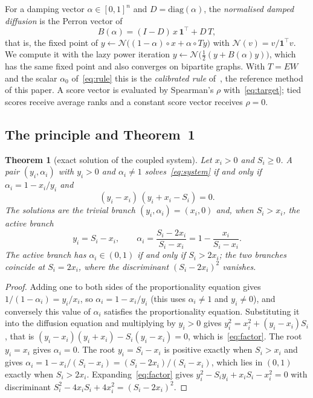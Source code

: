\documentclass[11pt,a4paper]{article}
\newtheorem{theorem}{Theorem}
\theoremstyle{definition}
\theoremstyle{plain}
\newcommand{\diag}{\mathrm{diag}}
\newcommand{\N}{\mathcal{N}}
\newcommand{\one}{\mathbf{1}}
\begin{document}
For a damping vector $\alpha\in[0,1]^n$ and $D=\diag(\alpha)$, the \emph{normalised damped diffusion} is the Perron vector of
\begin{equation}\label{eq:diffusion}
B(\alpha)=(I-D)\,x\,\one^{\top}+D\,T,
\end{equation}
that is, the fixed point of $y\leftarrow\N\big((1-\alpha)\circ x+\alpha\circ Ty\big)$ with $\N(v)=v/\one^{\top}v$. We compute it with the lazy power iteration $y\leftarrow\N\big(\tfrac12(y+B(\alpha)y)\big)$, which has the same fixed point and also converges on bipartite graphs. With $T=EW$ and the scalar $\alpha_0$ of~\eqref{eq:rule} this is the \emph{calibrated rule} of~\cite{konstantellos26}, the reference method of this paper. A score vector is evaluated by Spearman's $\rho$ with~\eqref{eq:target}; tied scores receive average ranks and a constant score vector receives $\rho=0$.

\subsection{The principle and Theorem~1}\label{sec:theorem}

\begin{theorem}[exact solution of the coupled system]\label{thm:factor}
Let $x_i>0$ and $S_i\ge0$. A pair $(y_i,\alpha_i)$ with $y_i>0$ and $\alpha_i\neq1$ solves~\eqref{eq:system} if and only if $\alpha_i=1-x_i/y_i$ and
\begin{equation}\label{eq:factor}
(y_i-x_i)\,(y_i+x_i-S_i)=0 .
\end{equation}
The solutions are the trivial branch $(y_i,\alpha_i)=(x_i,0)$ and, when $S_i>x_i$, the active branch
\begin{equation}\label{eq:active}
y_i=S_i-x_i,\qquad \alpha_i=\frac{S_i-2x_i}{S_i-x_i}=1-\frac{x_i}{S_i-x_i}.
\end{equation}
The active branch has $\alpha_i\in(0,1)$ if and only if $S_i>2x_i$; the two branches coincide at $S_i=2x_i$, where the discriminant $(S_i-2x_i)^2$ vanishes.
\end{theorem}

\begin{proof}
Adding one to both sides of the proportionality equation gives $1/(1-\alpha_i)=y_i/x_i$, so $\alpha_i=1-x_i/y_i$ (this uses $\alpha_i\ne1$ and $y_i\neq0$), and conversely this value of $\alpha_i$ satisfies the proportionality equation. Substituting it into the diffusion equation and multiplying by $y_i>0$ gives $y_i^2=x_i^2+(y_i-x_i)S_i$, that is $(y_i-x_i)(y_i+x_i)-S_i(y_i-x_i)=0$, which is~\eqref{eq:factor}. The root $y_i=x_i$ gives $\alpha_i=0$. The root $y_i=S_i-x_i$ is positive exactly when $S_i>x_i$ and gives $\alpha_i=1-x_i/(S_i-x_i)=(S_i-2x_i)/(S_i-x_i)$, which lies in $(0,1)$ exactly when $S_i>2x_i$. Expanding~\eqref{eq:factor} gives $y_i^2-S_iy_i+x_iS_i-x_i^2=0$ with discriminant $S_i^2-4x_iS_i+4x_i^2=(S_i-2x_i)^2$.
\end{proof}
\end{document}
